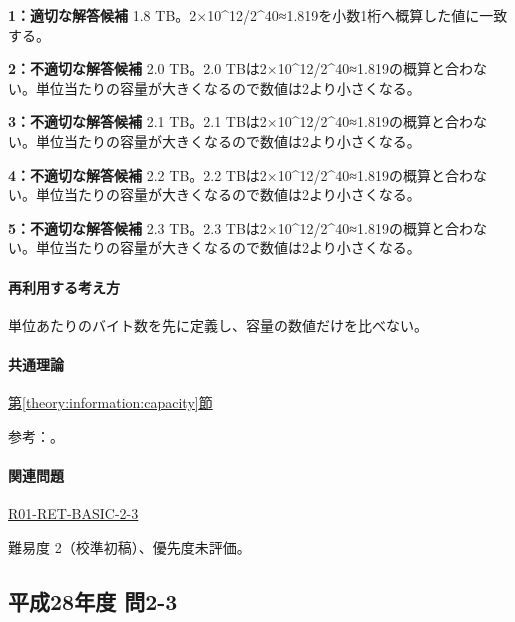\noindent\textbf{1：適切な解答候補} 1.8 TB。2×10\textasciicircum{}12/2\textasciicircum{}40≈1.819を小数1桁へ概算した値に一致する。\par

\noindent\textbf{2：不適切な解答候補} 2.0 TB。2.0 TBは2×10\textasciicircum{}12/2\textasciicircum{}40≈1.819の概算と合わない。単位当たりの容量が大きくなるので数値は2より小さくなる。\par

\noindent\textbf{3：不適切な解答候補} 2.1 TB。2.1 TBは2×10\textasciicircum{}12/2\textasciicircum{}40≈1.819の概算と合わない。単位当たりの容量が大きくなるので数値は2より小さくなる。\par

\noindent\textbf{4：不適切な解答候補} 2.2 TB。2.2 TBは2×10\textasciicircum{}12/2\textasciicircum{}40≈1.819の概算と合わない。単位当たりの容量が大きくなるので数値は2より小さくなる。\par

\noindent\textbf{5：不適切な解答候補} 2.3 TB。2.3 TBは2×10\textasciicircum{}12/2\textasciicircum{}40≈1.819の概算と合わない。単位当たりの容量が大きくなるので数値は2より小さくなる。\par

\paragraph{再利用する考え方} 単位あたりのバイト数を先に定義し、容量の数値だけを比べない。

\paragraph{共通理論} \hyperref[theory:information:capacity]{第\ref*{theory:information:capacity}節}

\par 参考：\cite{nist_binary_prefix}。

\paragraph{関連問題} \hyperref[q:r01-ret-basic-2-3]{R01-RET-BASIC-2-3}

\par 難易度 2（校準初稿）、優先度未評価。

\subsection{平成28年度 問2-3}
\label{q:h28-reg-basic-2-3}

